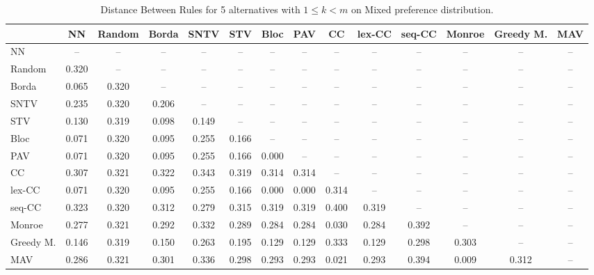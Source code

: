 
\begin{table*}
\centering
\begin{tabular}{lccccccccccccc}
\toprule
 & NN & Random & Borda & SNTV & STV & Bloc & PAV & CC & lex-CC & seq-CC & Monroe & Greedy M. & MAV \\
\midrule
NN & -- & -- & -- & -- & -- & -- & -- & -- & -- & -- & -- & -- & -- \\
Random & 0.320 & -- & -- & -- & -- & -- & -- & -- & -- & -- & -- & -- & -- \\
Borda & 0.065 & 0.320 & -- & -- & -- & -- & -- & -- & -- & -- & -- & -- & -- \\
SNTV & 0.235 & 0.320 & 0.206 & -- & -- & -- & -- & -- & -- & -- & -- & -- & -- \\
STV & 0.130 & 0.319 & 0.098 & 0.149 & -- & -- & -- & -- & -- & -- & -- & -- & -- \\
Bloc & 0.071 & 0.320 & 0.095 & 0.255 & 0.166 & -- & -- & -- & -- & -- & -- & -- & -- \\
PAV & 0.071 & 0.320 & 0.095 & 0.255 & 0.166 & 0.000 & -- & -- & -- & -- & -- & -- & -- \\
CC & 0.307 & 0.321 & 0.322 & 0.343 & 0.319 & 0.314 & 0.314 & -- & -- & -- & -- & -- & -- \\
lex-CC & 0.071 & 0.320 & 0.095 & 0.255 & 0.166 & 0.000 & 0.000 & 0.314 & -- & -- & -- & -- & -- \\
seq-CC & 0.323 & 0.320 & 0.312 & 0.279 & 0.315 & 0.319 & 0.319 & 0.400 & 0.319 & -- & -- & -- & -- \\
Monroe & 0.277 & 0.321 & 0.292 & 0.332 & 0.289 & 0.284 & 0.284 & 0.030 & 0.284 & 0.392 & -- & -- & -- \\
Greedy M. & 0.146 & 0.319 & 0.150 & 0.263 & 0.195 & 0.129 & 0.129 & 0.333 & 0.129 & 0.298 & 0.303 & -- & -- \\
MAV & 0.286 & 0.321 & 0.301 & 0.336 & 0.298 & 0.293 & 0.293 & 0.021 & 0.293 & 0.394 & 0.009 & 0.312 & -- \\
\bottomrule
\end{tabular}

\caption{Distance Between Rules for 5 alternatives with $1 \leq k < m$ on Mixed preference distribution.}
\end{table*}
